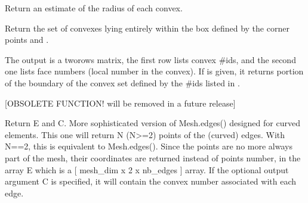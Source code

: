 \documentclass[a4paper,11pt,english]{sphinxmanual}
\begin{document}
\begin{fulllineitems}
\begin{fulllineitems}
\end{fulllineitems}


\begin{fulllineitems}
\label{\detokenize{python/cmdref_Mesh:getfem.Mesh.convex_radius}}
Return an estimate of the radius of each convex.

\end{fulllineitems}


\begin{fulllineitems}
\label{\detokenize{python/cmdref_Mesh:getfem.Mesh.convexes_in_box}}
Return the set of convexes lying entirely within the box defined by the corner points  and .

The output  is a two\sphinxhyphen{}rows matrix, the first row lists convex
\#ids, and the second one lists face numbers (local number in the
convex). If  is given, it returns portion of the boundary of
the convex set defined by the \#ids listed in .

\end{fulllineitems}


\begin{fulllineitems}
\label{\detokenize{python/cmdref_Mesh:getfem.Mesh.curved_edges}}
{[}OBSOLETE FUNCTION! will be removed in a future release{]}

Return E and C.
More sophisticated version of Mesh.edges() designed for
curved elements. This one will return N (N\textgreater{}=2) points of the
(curved) edges. With N==2, this is equivalent to
Mesh.edges(). Since the points are no more always part of
the mesh, their coordinates are returned instead of points
number, in the array E which is a {[} mesh\_dim x 2 x nb\_edges {]}
array.  If the optional output argument C is specified, it will
contain the convex number associated with each edge.


\end{fulllineitems}
\end{fulllineitems}
\end{document}
